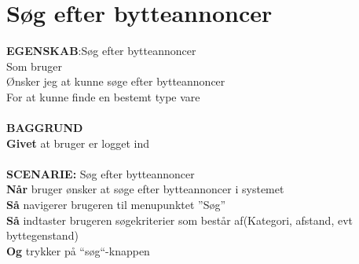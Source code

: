 \section{Søg efter bytteannoncer}
{\color{blue}\textbf{EGENSKAB}:}Søg efter bytteannoncer \\
Som bruger \\
Ønsker jeg at kunne søge efter bytteannoncer \\
For at kunne finde en bestemt type vare\\ \\
{\color{blue}\textbf{BAGGRUND}} \\
{\color{blue}\textbf{Givet}} at bruger er logget ind \\
\\
{\color{blue}\textbf{SCENARIE:}} Søg efter bytteannoncer \\
{\color{blue}\textbf{Når}} bruger ønsker at søge efter bytteannoncer i systemet\\
{\color{blue}\textbf{Så}} navigerer brugeren til menupunktet ”Søg” \\
{\color{blue}\textbf{Så}} indtaster brugeren søgekriterier som består af(Kategori, afstand, evt byttegenstand)\\
{\color{blue}\textbf{Og}} trykker på “søg“-knappen